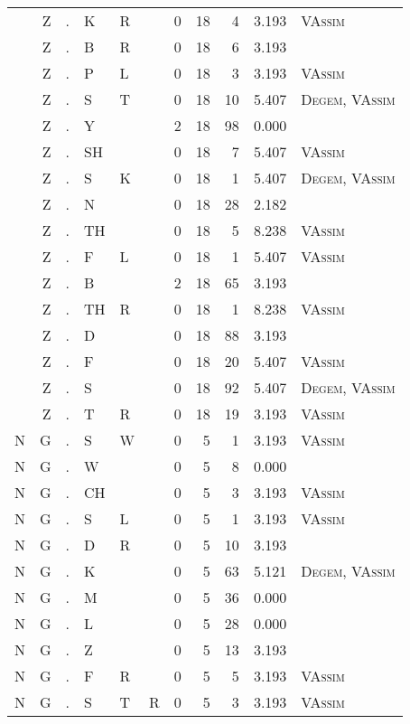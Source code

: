 \begin{longtable}{r@{ } r@{ } c@{ } l@{ } l@{ } l@{ } r r r r l }
 & Z & . & K & R &  & 0 & 18 & 4 & 3.193 & \textsc{VAssim} \\
 & Z & . & B & R &  & 0 & 18 & 6 & 3.193 &  \\
 & Z & . & P & L &  & 0 & 18 & 3 & 3.193 & \textsc{VAssim} \\
 & Z & . & S & T &  & 0 & 18 & 10 & 5.407 & \textsc{Degem}, \textsc{VAssim} \\
 & Z & . & Y &  &  & 2 & 18 & 98 & 0.000 &  \\
 & Z & . & SH &  &  & 0 & 18 & 7 & 5.407 & \textsc{VAssim} \\
 & Z & . & S & K &  & 0 & 18 & 1 & 5.407 & \textsc{Degem}, \textsc{VAssim} \\
 & Z & . & N &  &  & 0 & 18 & 28 & 2.182 &  \\
 & Z & . & TH &  &  & 0 & 18 & 5 & 8.238 & \textsc{VAssim} \\
 & Z & . & F & L &  & 0 & 18 & 1 & 5.407 & \textsc{VAssim} \\
 & Z & . & B &  &  & 2 & 18 & 65 & 3.193 &  \\
 & Z & . & TH & R &  & 0 & 18 & 1 & 8.238 & \textsc{VAssim} \\
 & Z & . & D &  &  & 0 & 18 & 88 & 3.193 &  \\
 & Z & . & F &  &  & 0 & 18 & 20 & 5.407 & \textsc{VAssim} \\
 & Z & . & S &  &  & 0 & 18 & 92 & 5.407 & \textsc{Degem}, \textsc{VAssim} \\
 & Z & . & T & R &  & 0 & 18 & 19 & 3.193 & \textsc{VAssim} \\
N & G & . & S & W &  & 0 & 5 & 1 & 3.193 & \textsc{VAssim} \\
N & G & . & W &  &  & 0 & 5 & 8 & 0.000 &  \\
N & G & . & CH &  &  & 0 & 5 & 3 & 3.193 & \textsc{VAssim} \\
N & G & . & S & L &  & 0 & 5 & 1 & 3.193 & \textsc{VAssim} \\
N & G & . & D & R &  & 0 & 5 & 10 & 3.193 &  \\
N & G & . & K &  &  & 0 & 5 & 63 & 5.121 & \textsc{Degem}, \textsc{VAssim} \\
N & G & . & M &  &  & 0 & 5 & 36 & 0.000 &  \\
N & G & . & L &  &  & 0 & 5 & 28 & 0.000 &  \\
N & G & . & Z &  &  & 0 & 5 & 13 & 3.193 &  \\
N & G & . & F & R &  & 0 & 5 & 5 & 3.193 & \textsc{VAssim} \\
N & G & . & S & T & R & 0 & 5 & 3 & 3.193 & \textsc{VAssim} \\

\end{longtable}
